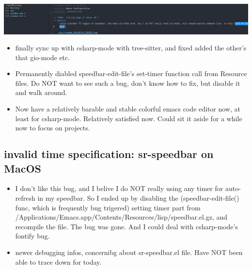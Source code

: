 \documentclass[9pt, b5paper]{article}
\begin{document}
\begin{center}
\includegraphics[width=.9\linewidth]{./pic/readme_20230210_221127.png}
\end{center}
\begin{itemize}
\item finally sync up with csharp-mode with tree-sitter, and fixed added the other's that gio-mode etc.
\item Permanently diabled speedbar-edit-file's set-timer function call from Resource files. Do NOT want to see such a bug, don't know how to fix, but disable it and walk around.
\item Now have a relatively barable and stable colorful emacs code editor now, at least for csharp-mode. Relatively satisfied now. Could sit it aside for a while now to focus on projects.
\end{itemize}
\subsection{invalid time specification: sr-speedbar on MacOS}
\label{sec:orgbd24fd4}
\begin{itemize}
\item I don't like this bug, and I belive I do NOT really using any timer for auto-refresh in my speedbar. So I ended up by disabling the (speedbar-edit-file() func, which is frequently bug trigered) setting timer part from /Applications/Emacs.app/Contents/Resources/lisp/speedbar.el.gz, and recompile the file. The bug was gone. And I could deal with csharp-mode's fontify bug.
\item newer debugging infos, concernibg about sr-speedbar.el file. Have NOT been able to trace down for today.
\end{itemize}
\end{document}
